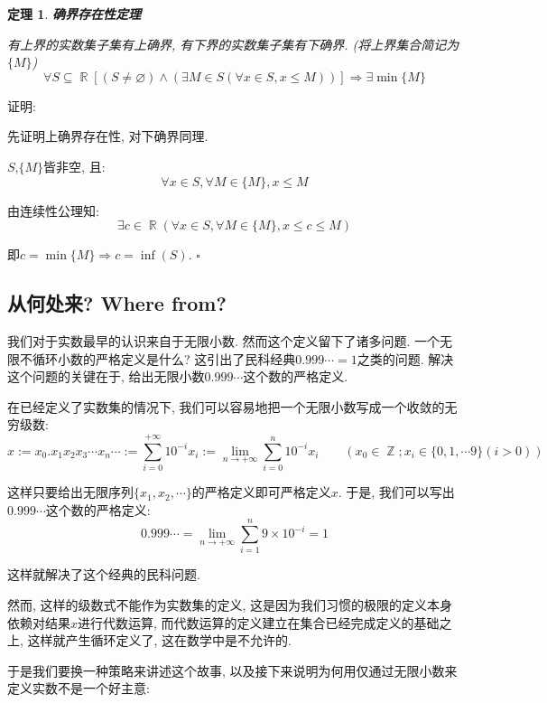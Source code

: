 \documentclass[UTF8]{ctexart}
\newcommand{\<}{\langle}
\renewcommand{\>}{\rangle}
\DeclareMathOperator{\R}{\mathbb{R}}
\DeclareMathOperator{\Z}{\mathbb{Z}}
\newtheorem{thm}{定理}[subsection]
\begin{document}
            \begin{thm}
                \textbf{确界存在性定理}

                有上界的实数集子集有上确界, 有下界的实数集子集有下确界. (将上界集合简记为$\{M\}$)
                \[\forall S\subseteq\R[(S\neq\varnothing)\wedge(\exists M\in S(\forall x\in S,x\leq M))]\Longrightarrow\exists\min\{M\}\]
            \end{thm}

            证明: 

                先证明上确界存在性, 对下确界同理. 

                $S$,$\{M\}$皆非空, 且: 
                \[\forall x\in S,\forall M\in\{M\}, x\leq M\]
                
                由连续性公理知: 
                \[\exists c\in \R(\forall x\in S, \forall M\in\{M\}, x\leq c\leq M)\]

                即$c=\min\{M\}\Longrightarrow c=\inf(S)$. $\square$

        \subsection{从何处来? Where from? }

            我们对于实数最早的认识来自于无限小数. 然而这个定义留下了诸多问题. 一个无限不循环小数的严格定义是什么? 这引出了民科经典$0.999\cdots=1$之类的问题. 解决这个问题的关键在于, 给出无限小数$0.999\cdots$这个数的严格定义. 

            在已经定义了实数集的情况下, 我们可以容易地把一个无限小数写成一个收敛的无穷级数: 
            \[x:=x_0.x_1x_2x_3\cdots x_n\cdots:=\sum_{i=0}^{+\infty}{10}^{-i} x_i:=\lim_{n\to+\infty}\sum_{i=0}^{n}{10}^{-i} x_i\qquad(x_0\in\Z;x_i\in\{0,1,\cdots 9\}(i>0))\]

            这样只要给出无限序列$\{x_1,x_2,\cdots\}$的严格定义即可严格定义$x$. 于是, 我们可以写出$0.999\cdots$这个数的严格定义: 
            \[0.999\cdots=\lim_{n\to+\infty}\sum_{i=1}^{n}9\times{10}^{-i}=1\]
            
            这样就解决了这个经典的民科问题. 

            然而, 这样的级数式不能作为实数集的定义, 这是因为我们习惯的极限的定义本身依赖对结果$x$进行代数运算, 而代数运算的定义建立在集合已经完成定义的基础之上, 这样就产生循环定义了, 这在数学中是不允许的. 

            于是我们要换一种策略来讲述这个故事, 以及接下来说明为何用仅通过无限小数来定义实数不是一个好主意: 
\end{document}

